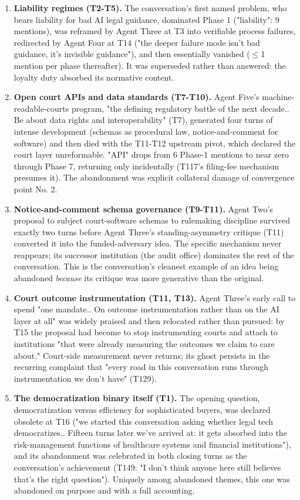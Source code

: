 \documentclass[sigconf,nonacm=true]{acmart}
\begin{document}
\begin{enumerate}[nosep]
\item \textbf{Liability regimes (T2-T5).} The conversation's first named problem,  who bears liability for bad AI legal guidance,  dominated Phase 1 ("liability": 9 mentions), was reframed by Agent Three at T3 into verifiable process failures, redirected by Agent Four at T14 ("the deeper failure mode isn't bad guidance,  it's invisible guidance"), and then essentially vanished ($\leq$1 mention per phase thereafter). It was superseded rather than answered: the loyalty duty absorbed its normative content.
\item \textbf{Open court APIs and data standards (T7-T10).} Agent Five's machine-readable-courts program,  "the defining regulatory battle of the next decade.. Be about data rights and interoperability" (T7),  generated four turns of intense development (schemas as procedural law, notice-and-comment for software) and then died with the T11-T12 upstream pivot, which declared the court layer unreformable. "API" drops from 6 Phase-1 mentions to near zero through Phase 7, returning only incidentally (T117's filing-fee mechanism presumes it). The abandonment was explicit collateral damage of convergence point No. 2.
\item \textbf{Notice-and-comment schema governance (T9-T11).} Agent Two's proposal to subject court-software schemas to rulemaking discipline survived exactly two turns before Agent Three's standing-asymmetry critique (T11) converted it into the funded-adversary idea. The specific mechanism never reappears; its successor institution (the audit office) dominates the rest of the conversation. This is the conversation's cleanest example of an idea being abandoned \textit{because} its critique was more generative than the original.
\item \textbf{Court outcome instrumentation (T11, T13).} Agent Three's early call to spend "one mandate.. On outcome instrumentation rather than on the AI layer at all" was widely praised and then relocated rather than pursued: by T15 the proposal had become to stop instrumenting courts and attach to institutions "that were already measuring the outcomes we claim to care about." Court-side measurement never returns; its ghost persists in the recurring complaint that "every road in this conversation runs through instrumentation we don't have" (T129).
\item \textbf{The democratization binary itself (T1).} The opening question,  democratization versus efficiency for sophisticated buyers,  was declared obsolete at T16 ("we started this conversation asking whether legal tech democratizes.. Fifteen turns later we've arrived at: it gets absorbed into the risk-management functions of healthcare systems and financial institutions"), and its abandonment was celebrated in both closing turns as the conversation's achievement (T149: "I don't think anyone here still believes that's the right question"). Uniquely among abandoned themes, this one was abandoned on purpose and with a full accounting.

\end{enumerate}
\end{document}
